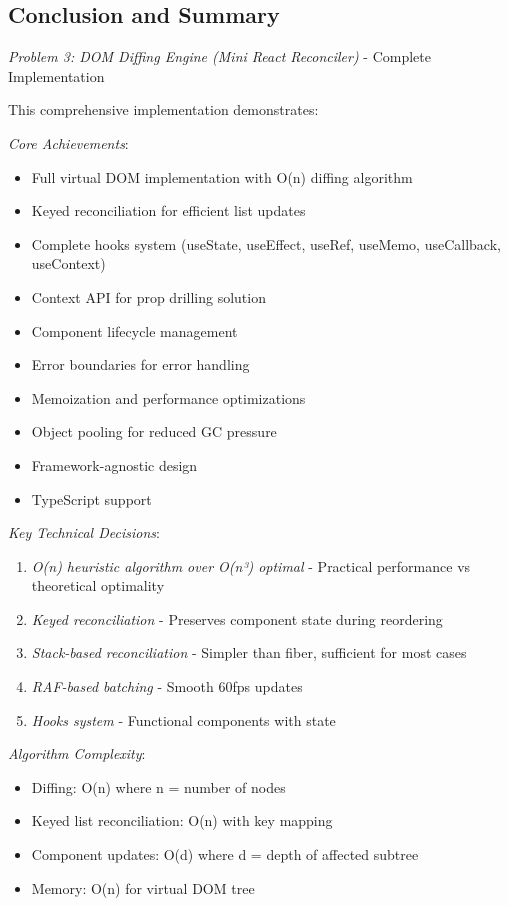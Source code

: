 \documentclass[11pt]{article}
\begin{document}
\subsection{Conclusion and Summary}
\label{sec:org98474d2}

\emph{Problem 3: DOM Diffing Engine (Mini React Reconciler)} - Complete Implementation

This comprehensive implementation demonstrates:

\emph{Core Achievements}:

\begin{itemize}
\item Full virtual DOM implementation with O(n) diffing algorithm
\item Keyed reconciliation for efficient list updates
\item Complete hooks system (useState, useEffect, useRef, useMemo, useCallback, useContext)
\item Context API for prop drilling solution
\item Component lifecycle management
\item Error boundaries for error handling
\item Memoization and performance optimizations
\item Object pooling for reduced GC pressure
\item Framework-agnostic design
\item TypeScript support
\end{itemize}

\emph{Key Technical Decisions}:

\begin{enumerate}
\item \emph{O(n) heuristic algorithm over O(n³) optimal} - Practical performance vs theoretical optimality
\item \emph{Keyed reconciliation} - Preserves component state during reordering
\item \emph{Stack-based reconciliation} - Simpler than fiber, sufficient for most cases
\item \emph{RAF-based batching} - Smooth 60fps updates
\item \emph{Hooks system} - Functional components with state
\end{enumerate}

\emph{Algorithm Complexity}:

\begin{itemize}
\item Diffing: O(n) where n = number of nodes
\item Keyed list reconciliation: O(n) with key mapping
\item Component updates: O(d) where d = depth of affected subtree
\item Memory: O(n) for virtual DOM tree
\end{itemize}
\end{document}
